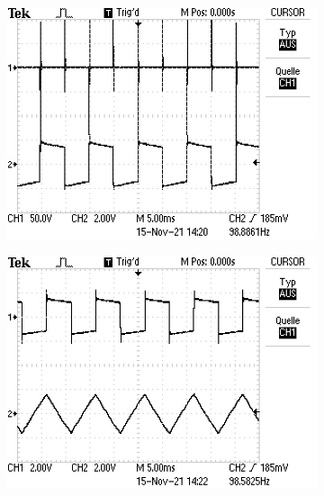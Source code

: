 \begin{figure}[H]
  \centering
  \begin{subfigure}{.4\textwidth}
    \includegraphics[width=\linewidth]{data/ALL0062/F0062TEK.JPG}
  \end{subfigure}
  \begin{subfigure}{.4\textwidth}
    \includegraphics[width=\linewidth]{data/ALL0063/F0063TEK.JPG}
  \end{subfigure}
  \begin{subfigure}{.4\textwidth}

\end{subfigure}
\end{figure}
